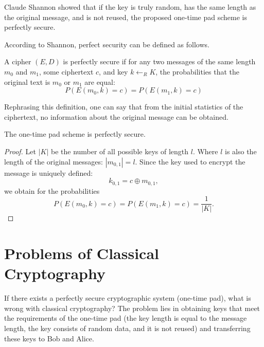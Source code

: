 Claude Shannon showed \cite{bShenonCrypto} that if the key is truly random, has the same length as the original message, and is not reused, the proposed one-time pad scheme is perfectly secure.

According to Shannon, perfect security can be defined as follows.
\begin{definition}
A cipher $\left(E, D\right)$ is perfectly secure if for any two messages of the same length $m_0$ and $m_1$, some ciphertext $c$, and key $k \leftarrow_R K$, the probabilities that the original text is $m_0$ or $m_1$ are equal:
\begin{equation}
P\left(E\left(m_0, k\right) = c \right) = 
P\left(E\left(m_1, k\right) = c \right)
\nonumber
\end{equation}
\end{definition}
Rephrasing this definition, one can say that from the initial statistics of the ciphertext, no information about the original message can be obtained.

\begin{theorem}
The one-time pad scheme is perfectly secure.
\end{theorem}

\begin{proof}
Let $\left|K\right|$ be the number of all possible keys of length $l$. Where $l$ is also the length of the original messages: $\left|m_{0,1}\right| = l$. Since the key used to encrypt the message is uniquely defined:
\begin{equation}
k_{0,1} = c \oplus m_{0,1},
\nonumber
\end{equation} 
we obtain for the probabilities
\begin{equation}
P\left(E\left(m_0, k\right) = c \right) = 
P\left(E\left(m_1, k\right) = c \right) = 
\frac{1}{\left|K\right|}.
\nonumber
\end{equation}
\end{proof}

\section{Problems of Classical Cryptography}

If there exists a perfectly secure cryptographic system (one-time pad), what is wrong with classical cryptography? The problem lies in obtaining keys that meet the requirements of the one-time pad (the key length is equal to the message length, the key consists of random data, and it is not reused) and transferring these keys to Bob and Alice.

